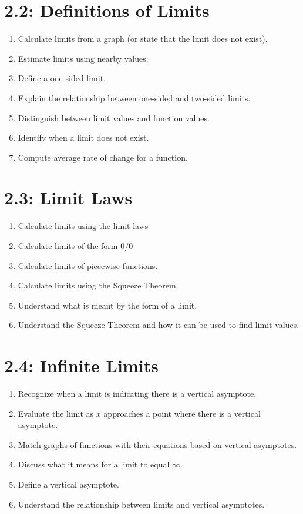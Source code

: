 \documentclass[11pt]{article}
\begin{document}
\section*{2.2: Definitions of Limits}
\begin{enumerate}
	\item Calculate limits from a graph (or state that the limit does not exist).
	\item Estimate limits using nearby values.
	\item Define a one-sided limit.
	\item Explain the relationship between one-sided and two-sided limits.
	\item Distinguish between limit values and function values.
	\item Identify when a limit does not exist.
	\item Compute average rate of change for a function.
\end{enumerate}


\section*{2.3: Limit Laws}
\begin{enumerate}
	\item Calculate limits using the limit laws
	\item Calculate limits of the form $0/0$
	\item Calculate limits of piecewise functions.
	\item Calculate limits using the Squeeze Theorem.
	\item Understand what is meant by the form of a limit.
	\item Understand the Squeeze Theorem and how it can be used to find limit values.
\end{enumerate}


\section*{2.4: Infinite Limits}
\begin{enumerate}
	\item Recognize when a limit is indicating there is a vertical asymptote.
	\item Evaluate the limit as $x$ approaches a point where there is a vertical asymptote.
	\item Match graphs of functions with their equations based on vertical asymptotes.
	\item Discuss what it means for a limit to equal $\infty$.
	\item Define a vertical asymptote.
	\item Understand the relationship between limits and vertical asymptotes.
\end{enumerate}
\end{document}
